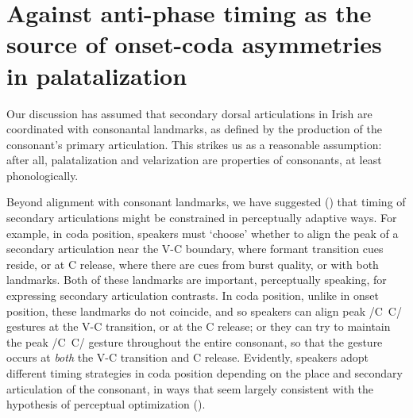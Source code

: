 \documentclass[output=paper,colorlinks,citecolor=brown]{langscibook}
\newcommand{\pal}{\ipa{ʲ}}
\newcommand{\vel}{\ipa{ˠ}}
\begin{document}
\section{Against anti-phase timing as the source of onset-coda asymmetries in palatalization}\label{sec:codaphasing}
Our discussion has assumed that secondary dorsal articulations in Irish are coordinated with consonantal landmarks, as defined by the production of the consonant's primary articulation. This strikes us as a reasonable assumption: after all, palatalization and velarization are properties of consonants, at least phonologically.

Beyond alignment with consonant landmarks, we have suggested () that timing of secondary articulations might be constrained in perceptually adaptive ways. For example, in coda position, speakers must `choose' whether to align the peak of a secondary articulation near the V-C boundary, where formant transition cues reside, or at C release, where there are cues from burst quality, or with both landmarks. Both of these landmarks are important, perceptually speaking, for expressing secondary articulation contrasts. In coda position, unlike in onset position, these landmarks do not coincide, and so speakers can align peak /C\pal\ C\vel/ gestures at the V-C transition, or at the C release; or they can try to maintain the peak /C\pal\ C\vel/ gesture throughout the entire consonant, so that the gesture occurs at \emph{both} the V-C transition and C release. Evidently, speakers adopt different timing strategies in coda position depending on the place and secondary articulation of the consonant, in ways that seem largely consistent with the hypothesis of perceptual optimization ().
\end{document}
